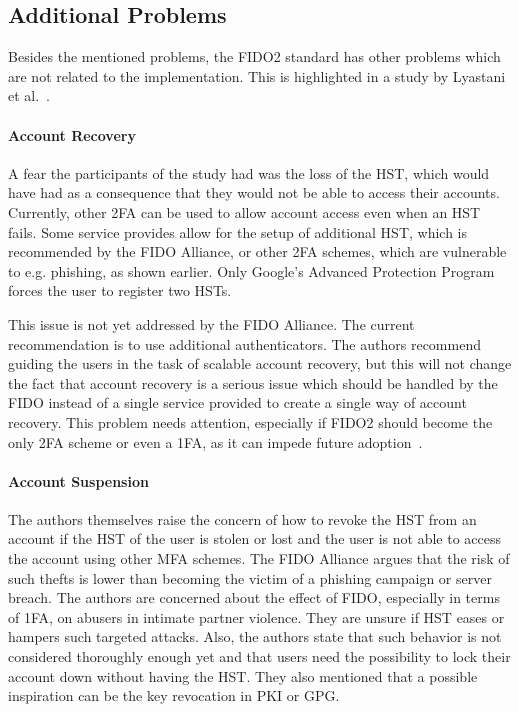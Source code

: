 \documentclass[runningheads]{llncs}
\begin{document}
\subsection{Additional Problems} \label{ref1}
Besides the mentioned problems, the FIDO2 standard has other problems which are not related to the implementation. This is highlighted in a study by Lyastani et al.~\cite{9152694}. 

\paragraph{Account Recovery}
A fear the participants of the study had was the loss of the HST, which would have had as a consequence that they would not be able to access their accounts. Currently, other 2FA can be used to allow account access even when an HST fails. Some service provides allow for the setup of additional HST, which is recommended by the FIDO Alliance, or other 2FA schemes, which are vulnerable to e.g. phishing, as shown earlier. Only Google's Advanced Protection Program forces the user to register two HSTs.

This issue is not yet addressed by the FIDO Alliance. The current recommendation is to use additional authenticators. The authors recommend guiding the users in the task of scalable account recovery, but this will not change the fact that account recovery is a serious issue which should be handled by the FIDO instead of a single service provided to create a single way of account recovery. This problem needs attention, especially if FIDO2 should become the only 2FA scheme or even a 1FA, as it can impede future adoption~\cite{9152694}. 

\paragraph{Account Suspension}
The authors themselves raise the concern of how to revoke the HST from an account if the HST of the user is stolen or lost and the user is not able to access the account using other MFA schemes. The FIDO Alliance argues that the risk of such thefts is lower than becoming the victim of a phishing campaign or server breach. The authors are concerned about the effect of FIDO, especially in terms of 1FA, on abusers in intimate partner violence. They are unsure if HST eases or hampers such targeted attacks. Also, the authors state that such behavior is not considered thoroughly enough yet and that users need the possibility to lock their account down without having the HST. They also mentioned that a possible inspiration can be the key revocation in PKI or GPG.
\end{document}
